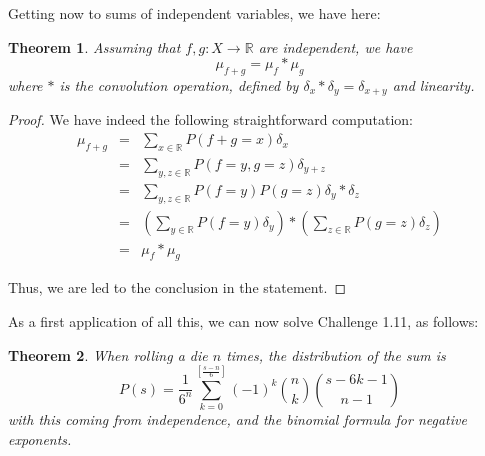 \documentclass[12pt]{amsbook}
\newtheorem{theorem}{Theorem}[chapter]
\begin{document}
Getting now to sums of independent variables, we have here:

\begin{theorem}
Assuming that $f,g:X\to\mathbb R$ are independent, we have
$$\mu_{f+g}=\mu_f*\mu_g$$
where $*$ is the convolution operation, defined by $\delta_x*\delta_y=\delta_{x+y}$ and linearity.
\end{theorem}

\begin{proof}
We have indeed the following straightforward computation:
\begin{eqnarray*}
\mu_{f+g}
&=&\sum_{x\in\mathbb R}P(f+g=x)\delta_x\\
&=&\sum_{y,z\in\mathbb R}P(f=y,g=z)\delta_{y+z}\\
&=&\sum_{y,z\in\mathbb R}P(f=y)P(g=z)\delta_y*\delta_z\\
&=&\left(\sum_{y\in\mathbb R}P(f=y)\delta_y\right)*\left(\sum_{z\in\mathbb R}P(g=z)\delta_z\right)\\
&=&\mu_f*\mu_g
\end{eqnarray*}

Thus, we are led to the conclusion in the statement.
\end{proof}

As a first application of all this, we can now solve Challenge 1.11, as follows:

\begin{theorem}
When rolling a die $n$ times, the distribution of the sum is
$$P(s)=\frac{1}{6^n}\sum_{k=0}^{[\frac{s-n}{6}]}(-1)^k\binom{n}{k}\binom{s-6k-1}{n-1}$$
with this coming from independence, and the binomial formula for negative exponents.
\end{theorem}
\end{document}

